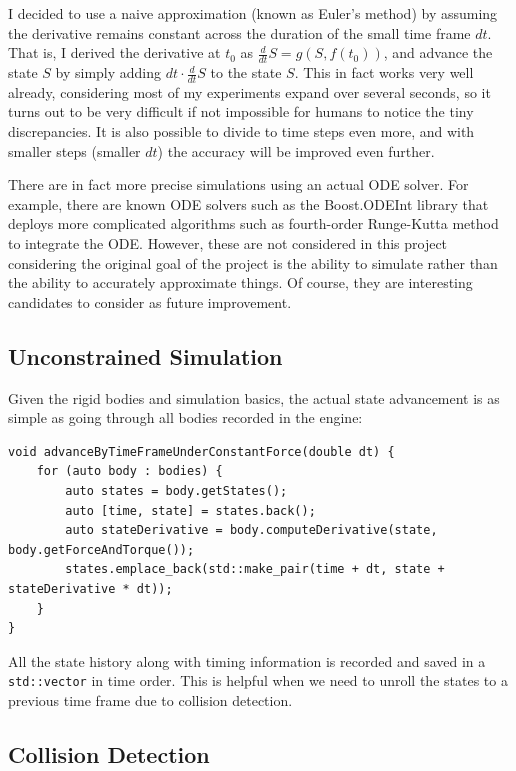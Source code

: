 \documentclass[12pt,a4paper,twoside,openright]{report}
\newcommand{\code}{\texttt}
\begin{document}
I decided to use a naive approximation (known as Euler's method) by assuming the derivative remains constant across the duration of the small time frame $dt$. That is, I derived the derivative at $t_0$ as $\frac{d}{dt}S=g(S, f(t_0))$, and advance the state $S$ by simply adding $dt \cdot \frac{d}{dt}S$ to the state $S$. This in fact works very well already, considering most of my experiments expand over several seconds, so it turns out to be very difficult if not impossible for humans to notice the tiny discrepancies. It is also possible to divide to time steps even more, and with smaller steps (smaller $dt$) the accuracy will be improved even further.

There are in fact more precise simulations using an actual ODE solver. For example, there are known ODE solvers such as the Boost.ODEInt library that deploys more complicated algorithms such as fourth-order Runge-Kutta method to integrate the ODE. However, these are not considered in this project considering the original goal of the project is the ability to simulate rather than the ability to accurately approximate things. Of course, they are interesting candidates to consider as future improvement.

\subsection{Unconstrained Simulation}

Given the rigid bodies and simulation basics, the actual state advancement is as simple as going through all bodies recorded in the engine:

\begin{verbatim}
void advanceByTimeFrameUnderConstantForce(double dt) {
    for (auto body : bodies) {
        auto states = body.getStates();
        auto [time, state] = states.back();
        auto stateDerivative = body.computeDerivative(state, body.getForceAndTorque());
        states.emplace_back(std::make_pair(time + dt, state + stateDerivative * dt));
    }
}
\end{verbatim}

All the state history along with timing information is recorded and saved in a \code{std::vector} in time order. This is helpful when we need to unroll the states to a previous time frame due to collision detection.

\subsection{Collision Detection}
\end{document}
